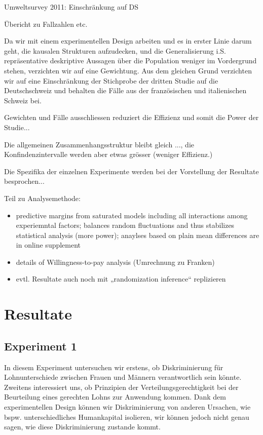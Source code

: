\documentclass[a4paper,12pt]{article}
\renewcommand{\baselinestretch}{1.1}
\newif\ifcomments
\newcommand{\comment}[1]{%
    \ifcomments\marginpar{\renewcommand{\baselinestretch}{1}\tiny\hspace*{-1.1em}\colorbox{gray!20}%
    {\textcolor{red}{\parbox[t]{.9in}{\raggedright #1}}}}\fi}
\begin{document}
Umweltsurvey 2011: Einschränkung auf DS

Übericht zu Fallzahlen etc.

Da wir mit einem experimentellen Design arbeiten und es in erster Linie darum geht,
die kausalen Strukturen aufzudecken, und die Generalisierung i.S. 
repräsentative deskriptive Aussagen über die Population weniger im Vordergrund stehen, verzichten wir auf eine Gewichtung.
Aus dem gleichen Grund verzichten wir auf eine Einschränkung der Stichprobe der dritten Studie auf die Deutschschweiz und 
behalten die Fälle aus der französischen und italienischen Schweiz bei.

Gewichten und Fälle ausschliessen reduziert die Effizienz und somit die Power der Studie...

Die allgemeinen Zusammenhangsstruktur bleibt gleich ..., die Konfindenzintervalle werden aber etwas grösser (weniger Effizienz.)

Die Spezifika der einzelnen Experimente werden bei der Vorstellung der Resultate besprochen...

Teil zu Analysemethode: 
\begin{itemize}
    \item predictive margins from saturated models including all interactions among experiemntal factors; balances random 
fluctuations and thus stabilizes statistical analysis (more power); anaylses based on plain mean differences are in online supplement 
    \item details of Willingness-to-pay analysis (Umrechnung zu Franken)
    \item evtl. Resultate auch noch mit „randomization inference“ replizieren
\end{itemize}


\section{Resultate}

\subsection{Experiment 1}
\comment{Teile der Beschreibung der Daten könnten in den Abschnitt „Daten und Methode“}

In diesem Experiment untersuchen wir erstens, ob Diskriminierung für
Lohnunterschiede zwischen Frauen und Männern verantwortlich sein könnte.
Zweitens interessiert uns, ob Prinzipien der Verteilungsgerechtigkeit bei der
Beurteilung eines gerechten Lohns zur Anwendung kommen. Dank dem
experimentellen Design können wir Diskriminierung von anderen Ursachen, wie
bspw. unterschiedliches Humankapital isolieren, wir können jedoch nicht genau
sagen, wie diese Diskriminierung zustande kommt.
\end{document}
